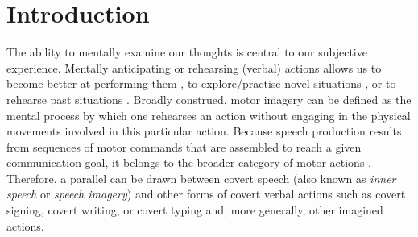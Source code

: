 \documentclass[utf8]{template/frontiersSCNS} %
\begin{document}
\newpage

\section{Introduction}


The ability to mentally examine our thoughts is central to our subjective experience. Mentally anticipating or rehearsing (verbal) actions allows us to become better at performing them \citep[e.g.,][]{toth2020}, to explore/practise novel situations \citep{babar}, or to rehearse past situations \citep{babar}. Broadly construed, motor imagery can be defined as the mental process by which one rehearses an action without engaging in the physical movements involved in this particular action. Because speech production results from sequences of motor commands that are assembled to reach a given communication goal, it belongs to the broader category of motor actions \citep{jeannerod_motor_2006}. Therefore, a parallel can be drawn between covert speech (also known as \textit{inner speech} or \textit{speech imagery}) \citep[for reviews, see][]{alderson-day_inner_2015, perrone-bertolotti_what_2014, loevenbruck_cognitive_2018} and other forms of covert verbal actions such as covert signing, covert writing, or covert typing and, more generally, other imagined actions.
\end{document}
